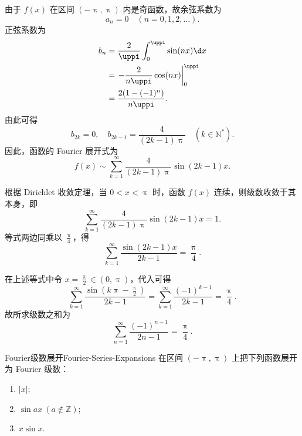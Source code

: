 \begin{solution}
    由于 $f(x)$ 在区间 $(-\uppi, \uppi)$ 内是奇函数，故余弦系数为
    \begin{equation}\label{eq:sgn-an}
        a_n = 0 \quad (n = 0, 1, 2, \dots).
    \end{equation}
    正弦系数为
    \begin{equation}\label{eq:sgn-bn}
        \begin{aligned}
            b_n & = \frac{2}{\uppi} \int_{0}^{\uppi} \sin(nx) \d x        \\
                & = \left. -\frac{2}{n\uppi} \cos(nx) \right|_{0}^{\uppi} \\
                & = \frac{2(1 - (-1)^n)}{n\uppi}.
        \end{aligned}
    \end{equation}
    由此可得
    \begin{equation}\label{eq:sgn-bn-cases}
        b_{2k} = 0, \quad b_{2k-1} = \frac{4}{(2k-1)\uppi} \quad (k \in \mathbb{N}^*).
    \end{equation}
    因此，函数的 Fourier 展开式为
    \begin{equation}
        \boxed{f(x) \sim \sum_{k=1}^{\infty} \frac{4}{(2k-1)\uppi} \sin(2k-1)x}.
    \end{equation}

    根据 Dirichlet 收敛定理，当 $0 < x < \uppi$ 时，函数 $f(x)$ 连续，则级数收敛于其本身，即
    \begin{equation}\label{eq:sgn-conv}
        \sum_{k=1}^{\infty} \frac{4}{(2k-1)\uppi} \sin(2k-1)x = 1.
    \end{equation}
    等式两边同乘以 $\frac{\uppi}{4}$，得
    \begin{equation}
        \boxed{\sum_{k=1}^{\infty} \frac{\sin(2k-1)x}{2k-1} = \frac{\uppi}{4}}.
    \end{equation}

    在上述等式中令 $x = \frac{\uppi}{2} \in (0, \uppi)$，代入可得
    \begin{equation}\label{eq:sub-x}
        \sum_{k=1}^{\infty} \frac{\sin(k\uppi - \frac{\uppi}{2})}{2k-1} = \sum_{k=1}^{\infty} \frac{(-1)^{k-1}}{2k-1} = \frac{\uppi}{4}.
    \end{equation}
    故所求级数之和为
    \begin{equation}
        \boxed{\sum_{n=1}^{\infty} \frac{(-1)^{n-1}}{2n-1} = \frac{\uppi}{4}}.
    \end{equation}
\end{solution}

\begin{problem}{Fourier级数展开}{Fourier-Series-Expansions}
    在区间 $(-\uppi, \uppi)$ 上把下列函数展开为 Fourier 级数：
    \begin{enumerate}
        \item $|x|$;
        \item $\sin ax \ (a \notin \mathbb{Z})$;
        \item $x \sin x$.
    \end{enumerate}
\end{problem}

